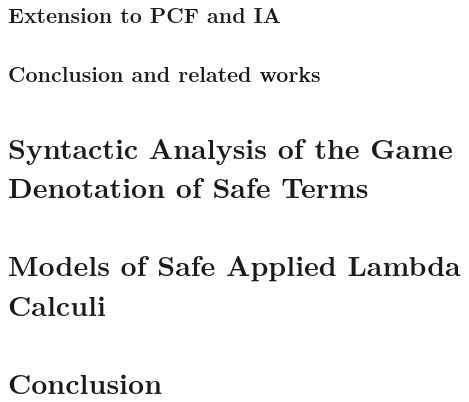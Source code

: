 \documentclass[11pt,a4paper,twoside,openright,draft]{myown}
\begin{document}
    \section{Extension to PCF and IA}
    

    \section{Conclusion and related works}
    


\chapter{Syntactic Analysis of the Game Denotation of Safe Terms}
    \label{chap:syntactic_gamesem}
    


\chapter{Models of Safe Applied Lambda Calculi}
    \label{chap:model}
    

\chapter{Conclusion}
    \label{chap:conclusion}
    




\pdfsyncstop

\cleardoublepage
{}
{}
  
  

  \cleardoublepage
  \printnotations

  \clearpage
  \printindex

\pdfsyncstart
\end{document}
